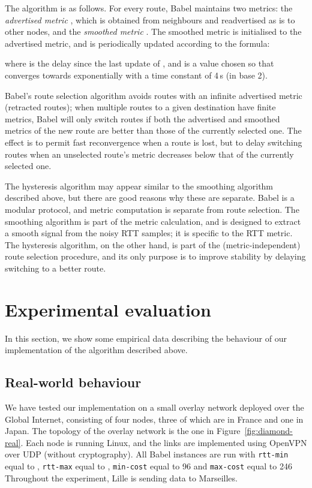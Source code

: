 \documentclass[conference,letterpaper]{IEEEtran}
\begin{document}
The algorithm is as follows.  For every route, Babel maintains two
metrics: the \emph{advertised metric} , which is obtained from
neighbours and readvertised as is to other nodes, and the
\emph{smoothed metric} .  The smoothed metric is initialised to
the advertised metric, and is periodically updated according to the
formula:

where  is the delay since the last update of , and
 is a value chosen so that  converges towards
 exponentially with a time constant of 4\,s (in base 2).

Babel's route selection algorithm avoids routes with an infinite
advertised metric (retracted routes); when multiple routes to a given
destination have finite metrics, Babel will only switch routes if both
the advertised and smoothed metrics of the new route are better than
those of the currently selected one.  The effect is to permit fast
reconvergence when a route is lost, but to delay switching routes when
an unselected route's metric decreases below that of the currently
selected one.

The hysteresis algorithm may appear similar to the smoothing algorithm
described above, but there are good reasons why these are separate.
Babel is a modular protocol, and metric computation is separate from
route selection.  The smoothing algorithm is part of the metric
calculation, and is designed to extract a smooth signal from the noisy
RTT samples; it is specific to the RTT metric.  The hysteresis
algorithm, on the other hand, is part of the (metric-independent)
route selection procedure, and its only purpose is to improve
stability by delaying switching to a better route.

\section{Experimental evaluation}

In this section, we show some empirical data describing the behaviour
of our implementation of the algorithm described above.

\subsection{Real-world behaviour}

We have tested our implementation on a small overlay network deployed
over the Global Internet, consisting of four nodes, three of which are
in France and one in Japan.  The topology of the overlay network is
the one in Figure~\ref{fig:diamond-real}.  Each node is running Linux,
and the links are implemented using OpenVPN over UDP (without
cryptography).  All Babel instances are run with \verb|rtt-min| equal
to , \verb|rtt-max| equal to ,
\verb|min-cost| equal to 96 and \verb|max-cost| equal to 246
Throughout the experiment, Lille is sending data to Marseilles.
\end{document}

